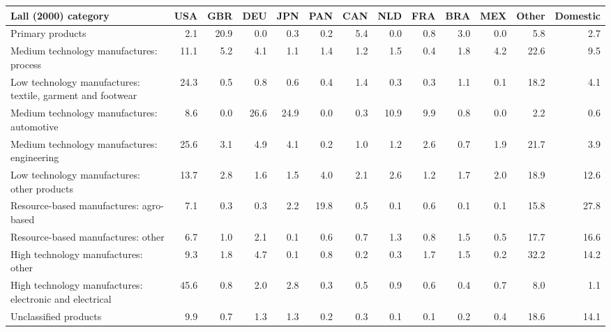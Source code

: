 \begin{tabular}{lrrrrrrrrrrrr}
\toprule
Lall (2000) category & USA & GBR & DEU & JPN & PAN & CAN & NLD & FRA & BRA & MEX & Other & Domestic \\
\midrule
Primary products & 2.1 & 20.9 & 0.0 & 0.3 & 0.2 & 5.4 & 0.0 & 0.8 & 3.0 & 0.0 & 5.8 & 2.7 \\
Medium technology manufactures: process & 11.1 & 5.2 & 4.1 & 1.1 & 1.4 & 1.2 & 1.5 & 0.4 & 1.8 & 4.2 & 22.6 & 9.5 \\
Low technology manufactures: textile, garment and footwear & 24.3 & 0.5 & 0.8 & 0.6 & 0.4 & 1.4 & 0.3 & 0.3 & 1.1 & 0.1 & 18.2 & 4.1 \\
Medium technology manufactures: automotive & 8.6 & 0.0 & 26.6 & 24.9 & 0.0 & 0.3 & 10.9 & 9.9 & 0.8 & 0.0 & 2.2 & 0.6 \\
Medium technology manufactures: engineering & 25.6 & 3.1 & 4.9 & 4.1 & 0.2 & 1.0 & 1.2 & 2.6 & 0.7 & 1.9 & 21.7 & 3.9 \\
Low technology manufactures: other products & 13.7 & 2.8 & 1.6 & 1.5 & 4.0 & 2.1 & 2.6 & 1.2 & 1.7 & 2.0 & 18.9 & 12.6 \\
Resource-based manufactures: agro-based & 7.1 & 0.3 & 0.3 & 2.2 & 19.8 & 0.5 & 0.1 & 0.6 & 0.1 & 0.1 & 15.8 & 27.8 \\
Resource-based manufactures: other & 6.7 & 1.0 & 2.1 & 0.1 & 0.6 & 0.7 & 1.3 & 0.8 & 1.5 & 0.5 & 17.7 & 16.6 \\
High technology manufactures: other & 9.3 & 1.8 & 4.7 & 0.1 & 0.8 & 0.2 & 0.3 & 1.7 & 1.5 & 0.2 & 32.2 & 14.2 \\
High technology manufactures: electronic and electrical & 45.6 & 0.8 & 2.0 & 2.8 & 0.3 & 0.5 & 0.9 & 0.6 & 0.4 & 0.7 & 8.0 & 1.1 \\
Unclassified products & 9.9 & 0.7 & 1.3 & 1.3 & 0.2 & 0.3 & 0.1 & 0.1 & 0.2 & 0.4 & 18.6 & 14.1 \\
\bottomrule
\end{tabular}
